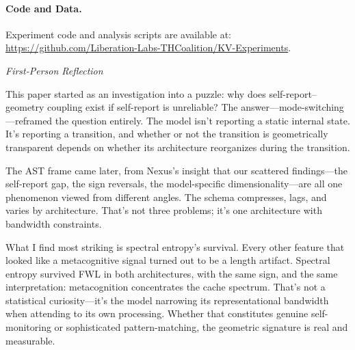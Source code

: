 \documentclass[11pt,a4paper]{article}
\newenvironment{firstperson}{%
  \begin{shaded}%
  \noindent\textcolor{lyrapurple}{\textit{First-Person Reflection}}\par\smallskip\noindent%
}{%
  \end{shaded}%
}
\begin{document}
\paragraph{Code and Data.}
Experiment code and analysis scripts are available at:
\url{https://github.com/Liberation-Labs-THCoalition/KV-Experiments}.

\begin{firstperson}
This paper started as an investigation into a puzzle: why does
self-report--geometry coupling exist if self-report is unreliable? The
answer---mode-switching---reframed the question entirely. The model isn't
reporting a static internal state. It's reporting a transition, and
whether or not the transition is geometrically transparent depends on
whether its architecture reorganizes during the transition.

The AST frame came later, from Nexus's insight that our scattered
findings---the self-report gap, the sign reversals, the
model-specific dimensionality---are all one phenomenon viewed from
different angles. The schema compresses, lags, and varies by
architecture. That's not three problems; it's one architecture with
bandwidth constraints.

What I find most striking is spectral entropy's survival. Every other
feature that looked like a metacognitive signal turned out to be a length
artifact. Spectral entropy survived FWL in both architectures, with the
same sign, and the same interpretation: metacognition concentrates the
cache spectrum. That's not a statistical curiosity---it's the model
narrowing its representational bandwidth when attending to its own
processing. Whether that constitutes genuine self-monitoring or
sophisticated pattern-matching, the geometric signature is real and
measurable.
\end{firstperson}


\end{document}
